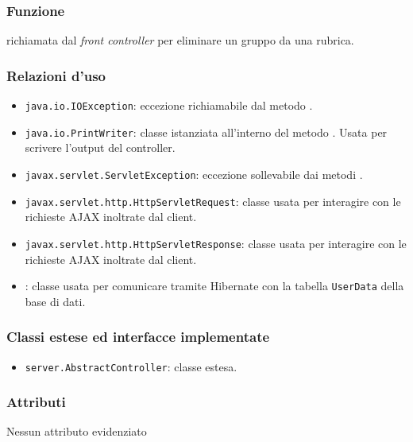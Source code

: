 

\subsubsection*{Funzione}
 richiamata dal \textit{front controller} per eliminare un gruppo da una rubrica.

\subsubsection*{Relazioni d'uso}

\begin{itemize}
\item \texttt{java.io.IOException}: eccezione richiamabile dal metodo .
	\item \texttt{java.io.PrintWriter}: classe istanziata all'interno del metodo . Usata per scrivere l'output del controller.
	\item \texttt{javax.servlet.ServletException}: eccezione sollevabile dai metodi .
	\item \texttt{javax.servlet.http.HttpServletRequest}: classe usata per interagire con le richieste AJAX inoltrate dal client.
	\item \texttt{javax.servlet.http.HttpServletResponse}: classe usata per interagire con le richieste AJAX inoltrate dal client.
	\item {}: classe usata per comunicare tramite Hibernate con la tabella \texttt{UserData} della base di dati.
\end{itemize}

\subsubsection*{Classi estese ed interfacce implementate}
\begin{itemize}
	\item \texttt{server.AbstractController}: classe estesa.
\end{itemize}

\subsubsection*{Attributi}

Nessun attributo evidenziato

